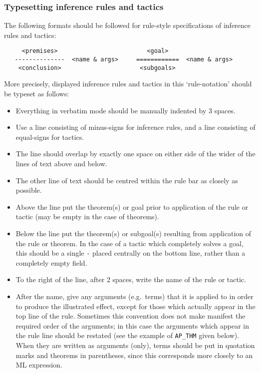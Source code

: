 \documentclass[12pt]{article}
\begin{document}
\subsubsection{Typesetting inference rules and tactics}

The following formats should be followed for rule-style specifications of
inference rules and tactics:

\medskip
\begin{verbatim}
     <premises>                         <goal>
   --------------  <name & args>     ============  <name & args>
    <conclusion>                      <subgoals>
\end{verbatim}
\medskip

\noindent More precisely, displayed inference rules and tactics in this
`rule-notation' should be typeset as follows:

\begin{itemize}

\item Everything in verbatim mode should be manually indented by 3 spaces.

\item Use a line consisting of minus-signs for inference rules, and a line
consisting of equal-signs for tactics.

\item The line should overlap by exactly one space on either side of the wider
of the lines of text above and below.

\item The other line of text should be centred within the rule bar as closely
as possible.

\item Above the line put the theorem(s) or goal prior to application of the
rule or tactic (may be empty in the case of theorems).

\item Below the line put the theorem(s) or subgoal(s) resulting from
application of the rule or theorem. In the case of a tactic which completely
solves a goal, this should be a single {\tt -} placed centrally on the bottom
line, rather than a completely empty field.

\item To the right of the line, after 2 spaces, write the name of the rule or
tactic.

\item After the name, give any arguments (e.g.\ terms) that it is applied to in
order to produce the illustrated effect, except for those which actually appear
in the top line of the rule. Sometimes this convention does not make manifest
the required order of the arguments; in this case the arguments which appear in
the rule line should be restated (see the example of {\small\verb!AP_THM!}
given below). When they are written as arguments (only), terms should be
put in quotation marks and theorems in parentheses, since this corresponds more
closely to an ML expression.

\end{itemize}
\end{document}
